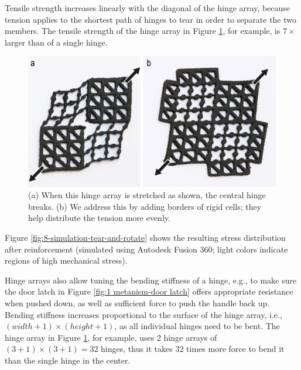 Tensile strength increases linearly with the diagonal of the hinge array, because tension applies to the shortest path of hinges to tear in order to separate the two members. The tensile strength of the hinge array in Figure \ref{fig:7-hinge-tear}, for example, is $7\times$ larger than of a single hinge.

\begin{figure} [h]
    \includegraphics[width=\textwidth]{chapters/metamaterial-mechanisms-FIG/7-hinge-tear.pdf}
    \caption[Short figure name.]{(a) When this hinge array is stretched as shown, the central hinge breaks. (b) We address this by adding borders of rigid cells; they help distribute the tension more evenly. 
    \label{fig:7-hinge-tear}}
\end{figure}

Figure \ref{fig:8-simulation-tear-and-rotate} shows the resulting stress distribution after reinforcement (simulated using Autodesk Fusion 360; light colors indicate regions of high mechanical stress).

Hinge arrays also allow tuning the bending stiffness of a hinge, e.g., to make sure the door latch in Figure \ref{fig:1 metanism-door latch} offers appropriate resistance when pushed down, as well as sufficient force to push the handle back up. Bending stiffness increases proportional to the surface of the hinge array, i.e., $(width+1) \times (height+1)$, as all individual hinges need to be bent. The hinge array in Figure \ref{fig:7-hinge-tear}, for example, uses 2 hinge arrays of $(3+1) \times (3+1) = 32$ hinges, thus it takes 32 times more force to bend it than the single hinge in the center.

